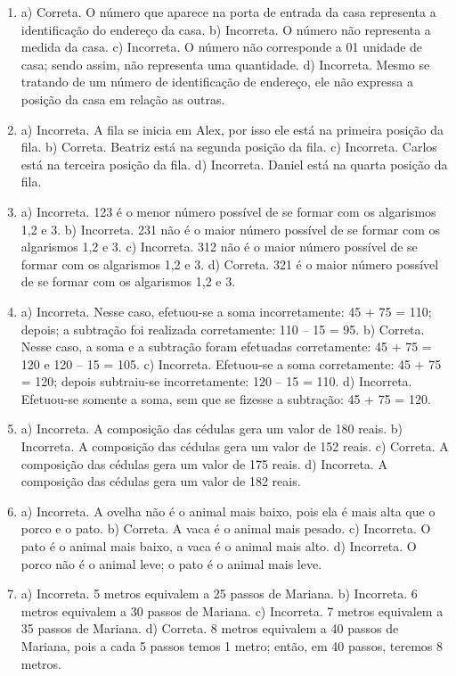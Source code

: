 \begin{enumerate}
\item
a) Correta. O número que aparece na porta de entrada da casa representa a identificação do endereço da casa.
b) Incorreta. O número não representa a medida da casa.
c) Incorreta. O número não corresponde a 01 unidade de casa; sendo assim, não representa uma quantidade.
d) Incorreta. Mesmo se tratando de um número de identificação de endereço, ele não expressa a posição da casa em relação as outras.

\item
a) Incorreta. A fila se inicia em Alex, por isso ele está na primeira posição da fila.
b) Correta. Beatriz está na segunda posição da fila.
c) Incorreta. Carlos está na terceira posição da fila.
d) Incorreta. Daniel está na quarta posição da fila.

\item
a) Incorreta. 123 é o menor número possível de se formar com os algarismos 1,2 e 3.
b) Incorreta. 231 não é o maior número possível de se formar com os algarismos 1,2 e 3.
c) Incorreta. 312 não é o maior número possível de se  formar com os algarismos 1,2 e 3.
d) Correta. 321 é o maior número possível de se formar com os algarismos 1,2 e 3.

\item
a) Incorreta. Nesse caso, efetuou-se a soma incorretamente: 45 + 75 = 110; depois; a subtração foi realizada corretamente: 110 -- 15 = 95.
b) Correta. Nesse caso, a soma e a subtração foram efetuadas corretamente: 45 + 75 = 120 e 120 -- 15 = 105.
c) Incorreta. Efetuou-se a soma corretamente: 45 + 75 = 120; depois
subtraiu-se incorretamente: 120 -- 15 = 110.
d) Incorreta. Efetuou-se somente a soma, sem que se fizesse a subtração: 45 + 75 = 120.

\item
a) Incorreta. A composição das cédulas gera um valor de 180 reais.
b) Incorreta. A composição das cédulas gera um valor de 152 reais.
c) Correta. A composição das cédulas gera um valor de 175 reais.
d) Incorreta. A composição das cédulas gera um valor de 182 reais.

\item
a) Incorreta. A ovelha não é o animal mais baixo, pois ela é mais alta
que o porco e o pato.
b) Correta. A vaca é o animal mais pesado.
c) Incorreta. O pato é o animal mais baixo, a vaca é o animal mais alto.
d) Incorreta. O porco não é o animal leve; o pato é o animal mais leve.

\item
a) Incorreta. 5 metros equivalem a 25 passos de Mariana.
b) Incorreta. 6 metros equivalem a 30 passos de Mariana.
c) Incorreta. 7 metros equivalem a 35 passos de Mariana.
d) Correta. 8 metros equivalem a 40 passos de Mariana, pois a cada 5 passos temos 1 metro; então, em 40 passos, teremos 8 metros.


\end{enumerate}
